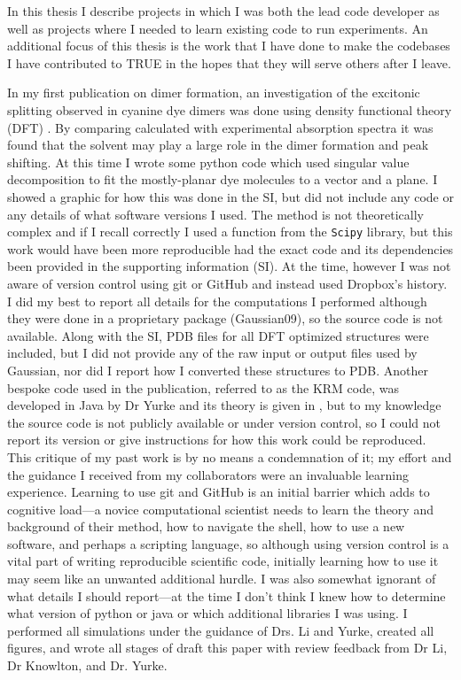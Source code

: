 In this thesis I describe projects in which I was both the lead code developer as well as projects where I needed to learn existing code to run  experiments.
An additional focus of this thesis is the work that I have done to make the codebases I have contributed to TRUE in the hopes that they will serve others after I leave.

In my first publication on dimer formation, an investigation of the excitonic splitting observed in cyanine dye dimers was done using density functional theory (DFT) \cite{Fothergill2018}.
By comparing calculated with experimental absorption spectra it was found that the solvent may play a large role in the dimer formation and peak shifting.
At this time I wrote some python code which used singular value decomposition to fit the mostly-planar dye molecules to a vector and a plane. 
I showed a graphic for how this was done in the SI, but did not include any code or any details of what software versions I used. 
The method is not theoretically complex and if I recall correctly I used a function from the \texttt{Scipy} library, but this work would have been more reproducible had the exact code and its dependencies been provided in the supporting information (SI).
At the time, however I was not aware of version control using git or GitHub and instead used Dropbox's history.
I did my best to report all details for the computations I performed although they were done in a proprietary package (Gaussian09), so the source code is not available.
Along with the SI, PDB files for all DFT optimized structures were included, but I did not provide any of the raw input or output files used by Gaussian, nor did I report how I converted these structures to PDB.
Another bespoke code used in the publication, referred to as the KRM code, was developed in Java by Dr Yurke and its theory is given in \citet[Supporting Information]{Cannon2017}, but to my knowledge the source code is not publicly available or under version control, so I could not report its version or give instructions for how this work could be reproduced.
This critique of my past work is by no means a condemnation of it; my effort and the guidance I received from my collaborators were an invaluable learning experience.
Learning to use git and GitHub is an initial barrier which adds to cognitive load---a novice computational scientist needs to learn the theory and background of their method, how to navigate the shell, how to use a new software, and perhaps a scripting language, so although using version control is a vital part of writing reproducible scientific code, initially learning how to use it may seem like an unwanted additional hurdle.
I was also somewhat ignorant of what details I should report---at the time I don't think I knew how to determine what version of python or java or which additional libraries I was using.
I performed all simulations under the guidance of Drs. Li and Yurke, created all figures, and wrote all stages of draft this paper with review feedback from Dr Li, Dr Knowlton, and Dr. Yurke.


